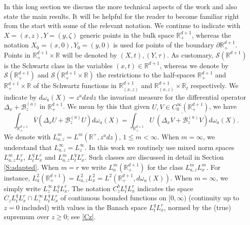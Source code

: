 \documentclass[11pt,letter]{amsart}
\def \RN {\mathbb{R}_+^{d+1}}
\def \R {\mathbb{R}}
\newcommand{\Ba}{\mathscr B_z^{(a)}}
\newcommand{\p}{\partial}
\numberwithin{equation}{section}
\numberwithin{equation}{section}
\begin{document}
In this long section we discuss the more technical aspects of the work and also state the main results. It will be helpful for the reader to become familiar right from the start with some of the relevant notation. We continue to indicate with $X = (x,z), Y = (y,\zeta)$ generic points in the bulk space $\RN$, whereas the notation $X_0 = (x,0), Y_0 = (y,0)$ is used for points of the boundary 
$\p \RN$. Points in $\RN\times \R$ will be denoted by
$(X,t), (Y,\tau)$. 
 As customary, $\mathscr S(\R^{d+1})$ is the Schwartz class in the variables $(x,t)\in \R^{d+1}$, whereas we  denote by $\mathscr S(\RN)$ and $\mathscr S(\RN\times \R)$ the restrictions to the half-spaces $\RN$ and $\RN\times \R$ of the Schwartz functions in $\R^{d+1}_{(x,z)}$ and $\R^{d+1}_{(x,z)}\times \R_t$ respectively. We indicate by  $d\omega_a(X) = z^a dx dz$ the invariant measure for the differential operator $\Delta_x +\Ba$ in $\RN$. We mean by this that given $U, V\in C^\infty_0(\RN)$, we have 
 \[
\int_{\RN} \overline V(\Delta_x U + \Ba U)d\omega_a(X) = \int_{\RN} U\ \overline{(\Delta_x V + \Ba V)}d\omega_a(X).
\]
We denote with $L^m_{a,z} = L^m(\R^+,z^a dz)$, $1\le m<\infty$. When $m=\infty$, we understand that $L^\infty_{a,z} = L^\infty_z$. In this work we routinely use mixed norm spaces $L^m_{a,z} L^r_x$, $L^q_t L^r_x$ and $L^m_{a,z} L^q_t L^r_x$. Such classes are discussed in detail in Section \ref{S:adapted}. When $m=r$ we write $L^m_a(\RN)$ for the class $L^m_{a,z} L^m_x$. For instance, $L^2_a(\RN) = L^2_{a,z} L^2_x  = L^2(\RN,d\omega_a(X))$. When $m=\infty$, we simply write $L^\infty_z L^q_t L^r_x$. The notation $C^b_z L^q_t L^r_x$ indicates the space $C_z L^q_t L^r_x\cap L^\infty_z L^q_t L^r_x$ of continuous bounded functions on $[0,\infty)$ (continuity up to $z=0$ included) with values in the Banach space $L^q_t L^r_x$, normed by the (true) supremum over $z\ge 0$; see \eqref{Cz}.  
\end{document}

